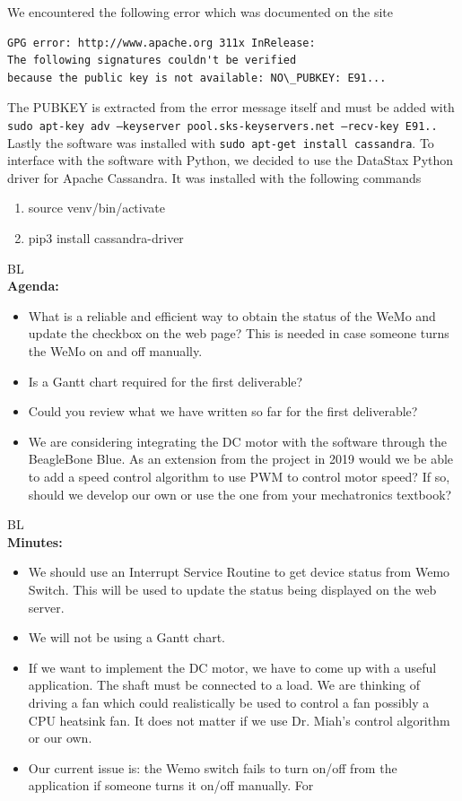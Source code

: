 \documentclass[fontsize=11pt, %
                             paper=letter, %
                             openany, %
                             captions=tableheading,
                             index=totoc,
                             hyperref]{labbook}
\begin{document}
We encountered the following error which was documented on the site
\begin{verbatim}
GPG error: http://www.apache.org 311x InRelease: 
The following signatures couldn't be verified 
because the public key is not available: NO\_PUBKEY: E91...
\end{verbatim}
The PUBKEY is extracted from the error message itself and must be added with 
\texttt{sudo apt-key adv --keyserver pool.sks-keyservers.net --recv-key E91..}
\medbreak\noindent
Lastly the software was installed with \texttt{sudo apt-get install cassandra}. To interface with the software with Python, we decided to use the DataStax Python driver for Apache Cassandra. It was installed with the following commands
\begin{enumerate}
\item source venv/bin/activate
\item pip3 install cassandra-driver
\end{enumerate}

BL\\
\textbf{Agenda:}
\begin{itemize}
\item What is a reliable and efficient way to obtain the status of the WeMo and update the checkbox on the web page? This is needed in case someone turns the WeMo on and off manually.
\item Is a Gantt chart required for the first deliverable?
\item Could you review what we have written so far for the first deliverable?
\item We are considering integrating the DC motor with the software through the BeagleBone Blue. As an extension from the project in 2019 would we be able to add a speed control algorithm to use PWM to control motor speed? If so, should we develop our own or use the one from your mechatronics textbook?
\end{itemize}

BL\\
\textbf{Minutes:}
\begin{itemize}
\item We should use an Interrupt Service Routine to get device status from Wemo Switch. This will be used to update the status being displayed on the web server. 
\item We will not be using a Gantt chart.
\item If we want to implement the DC motor, we have to come up with a useful application. The shaft must be connected to a load. We are thinking of driving a fan which could realistically be used to control a fan possibly a CPU heatsink fan. It does not matter if we use Dr. Miah's control algorithm or our own.
\item Our current issue is: the Wemo switch fails to turn on/off from the application if someone turns it on/off manually. For
\end{itemize}
\end{document}
